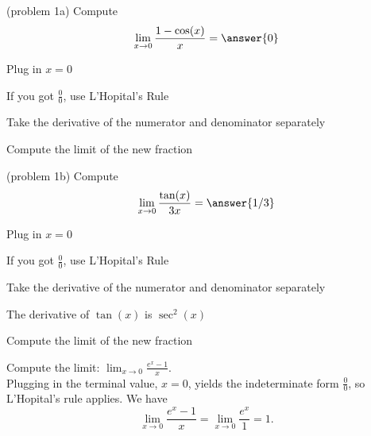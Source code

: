 \documentclass{ximera}
\begin{document}
\begin{problem}(problem 1a)
  Compute
  \[
  \lim_{x \to 0} \frac{1 - \cos(x)}{x} = \answer{0}
  \]
  
    \begin{hint}
      Plug in $x=0$
    \end{hint}
    \begin{hint}
      If you got $\frac00$, use L'Hopital's Rule
    \end{hint}
    \begin{hint}
      Take the derivative of the numerator and denominator separately
    \end{hint}
    \begin{hint}
      Compute the limit of the new fraction
    \end{hint}
    
		
	
\end{problem}

\begin{problem}(problem 1b)
  Compute
  \[
  \lim_{x \to 0} \frac{\tan(x)}{3x} = \answer{1/3}
  \]
  
    \begin{hint}
      Plug in $x=0$
    \end{hint}
    \begin{hint}
      If you got $\frac00$, use L'Hopital's Rule
    \end{hint}
    \begin{hint}
      Take the derivative of the numerator and denominator separately
    \end{hint}
		\begin{hint}
		  The derivative of $\tan(x)$ is $\sec^2(x)$
    \end{hint}
		\begin{hint}
      Compute the limit of the new fraction
    \end{hint}
	
\end{problem}


\begin{example}[example 2]
 Compute the limit: \quad $\displaystyle{\lim_{x \to 0} \frac{e^x - 1}{x}}.$\\
Plugging in the terminal value, $x=0$, yields 
the indeterminate form $\frac00$, so L'Hopital's rule applies.
We have 
\[\lim_{x \to 0} \frac{e^x - 1}{x} = \lim_{x \to 0} \frac{e^x}{1} = 1.\]
\end{example}
\end{document}

